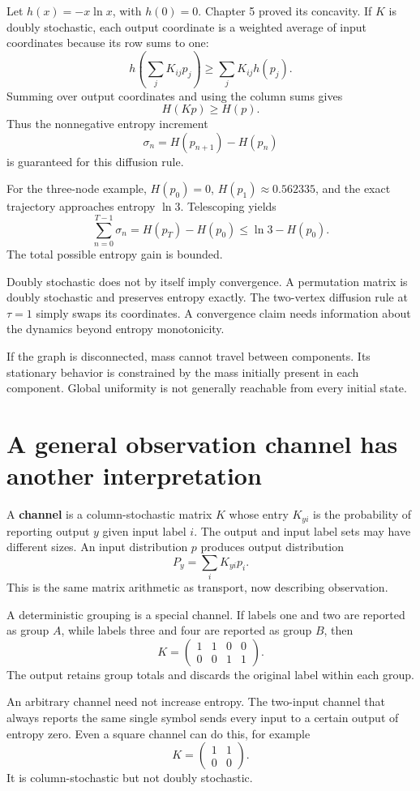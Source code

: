 \documentclass[11pt,oneside,openany]{book}
\theoremstyle{definition}
\theoremstyle{remark}
\numberwithin{equation}{chapter}
\begin{document}
Let \(h(x)=-x\ln x\), with \(h(0)=0\). Chapter 5 proved its concavity. If \(K\) is doubly stochastic, each output coordinate is a weighted average of input coordinates because its row sums to one: \[h\left(\sum_jK_{ij}p_j\right)\geq\sum_jK_{ij}h(p_j).\] Summing over output coordinates and using the column sums gives \[\boxed{H(Kp)\geq H(p).}\] Thus the nonnegative entropy increment \[\sigma_n=H(p_{n+1})-H(p_n)\] is guaranteed for this diffusion rule.

For the three-node example, \(H(p_0)=0\), \(H(p_1)\approx0.562335\), and the exact trajectory approaches entropy \(\ln3\). Telescoping yields \[\sum_{n=0}^{T-1}\sigma_n=H(p_T)-H(p_0)\leq\ln3-H(p_0).\] The total possible entropy gain is bounded.

Doubly stochastic does not by itself imply convergence. A permutation matrix is doubly stochastic and preserves entropy exactly. The two-vertex diffusion rule at \(\tau=1\) simply swaps its coordinates. A convergence claim needs information about the dynamics beyond entropy monotonicity.

If the graph is disconnected, mass cannot travel between components. Its stationary behavior is constrained by the mass initially present in each component. Global uniformity is not generally reachable from every initial state.

\section{A general observation channel has another interpretation}\label{ch10-a-general-observation-channel-has-another-interpretation}

A \textbf{channel} is a column-stochastic matrix \(K\) whose entry \(K_{yi}\) is the probability of reporting output \(y\) given input label \(i\). The output and input label sets may have different sizes. An input distribution \(p\) produces output distribution \[P_y=\sum_iK_{yi}p_i.\] This is the same matrix arithmetic as transport, now describing observation.

A deterministic grouping is a special channel. If labels one and two are reported as group \(A\), while labels three and four are reported as group \(B\), then \[K=\begin{pmatrix}1&1&0&0\\0&0&1&1\end{pmatrix}.\] The output retains group totals and discards the original label within each group.

An arbitrary channel need not increase entropy. The two-input channel that always reports the same single symbol sends every input to a certain output of entropy zero. Even a square channel can do this, for example \[K=\begin{pmatrix}1&1\\0&0\end{pmatrix}.\] It is column-stochastic but not doubly stochastic.
\end{document}
